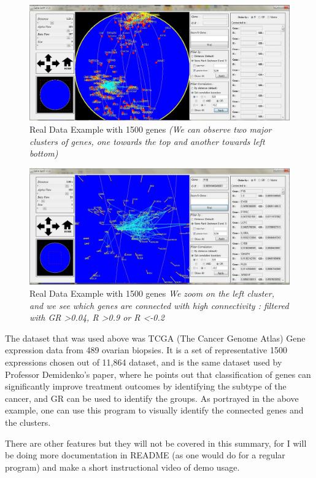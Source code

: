 \documentclass[]{article}
\begin{document}
\begin{figure}[h!]
	\centering
	\includegraphics[scale=0.48]{RealDataExample}
	\caption{Real Data Example with 1500 genes \textit{(We can observe two major clusters of genes, one towards the top and another towards left bottom)}}
\end{figure}

\begin{figure}[h!]
	\centering
	\includegraphics[scale=0.48]{RealDataExample2}
	\caption{Real Data Example with 1500 genes \textit{We zoom on the left cluster, and we see which genes are connected with high connectivity : filtered with GR \textgreater 0.04, R \textgreater 0.9 or R \textless -0.2}}
\end{figure}

The dataset that was used above was TCGA (The Cancer Genome Atlas) Gene expression data from 489 ovarian biopsies. It is a set of representative 1500 expressions chosen out of 11,864 dataset, and is the same dataset used by Professor Demidenko's paper, where he points out that classification of genes can significantly improve treatment outcomes by identifying the subtype of the cancer, and GR can be used to identify the groups.\cite{generankusage}
As portrayed in the above example, one can use this program to visually identify the connected genes and the clusters.

There are other features but they will not be covered in this summary, for I will be doing more documentation in README (as one would do for a regular program) and make a short instructional video of demo usage.
\end{document}
